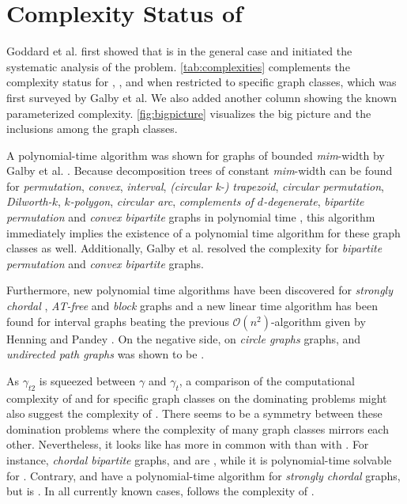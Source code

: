 \section{Complexity Status of \sdom}\label{ch:complexity-status}

Goddard et al. \cite{Goddard2014} first showed that \SDOM is \NPc in the general case and initiated the systematic analysis of the problem.  
\cref{tab:complexities} complements the complexity status for \doms, \sdoms, and \tdoms when restricted to specific graph classes, which was first surveyed by Galby et al. \cite{Galby2020}
We also added another column showing the known parameterized complexity. 
\cref{fig:bigpicture} visualizes the big picture and the inclusions among the graph classes.

A polynomial-time algorithm was shown for graphs of bounded \textit{mim}-width by Galby et al. \cite{Galby2020}.
Because decomposition trees of constant \textit{mim}-width can be found for \textit{permutation}, \textit{convex}, \textit{interval}, \textit{(circular k-)} \textit{trapezoid}, \textit{circular permutation}, \textit{Dilworth-$k$}, \textit{$k$-polygon}, \textit{circular arc}, \textit{complements of $d$-degenerate}, \textit{bipartite permutation} and \textit{convex bipartite} graphs in polynomial time \cite{Belmonte2011}, this algorithm immediately implies the existence of a polynomial time algorithm for these graph classes as well. 
Additionally, Galby et al. resolved the complexity for \textit{bipartite permutation} and \textit{convex bipartite} graphs.

Furthermore, new polynomial time algorithms have been discovered for \textit{strongly chordal} \cite{Tripathi2021}, \textit{AT-free} \cite{Kloks2021} and \textit{block} \cite{Henning2022} graphs and a new linear time algorithm has been found for interval graphs \cite{Pradhan2021} beating the previous $\mathcal{O}(n^2)$-algorithm given by Henning and Pandey \cite{Henning2019}.
On the negative side, \sdom on \textit{circle graphs} \cite{Kloks2021} graphs, and \textit{undirected path graphs} \cite{Henning2019} was shown to be \NPc.

As $\gamma_{t2}$ is squeezed between $\gamma$ and $\gamma_t$, a comparison of the computational complexity of \sdom and \tdom for specific graph classes on the dominating problems might also suggest the complexity of \sdoms.
There seems to be a symmetry between these domination problems where the complexity of many graph classes mirrors each other.
Nevertheless, it looks like \sdoms has more in common with \doms than with \tdoms.
For instance, \textit{chordal bipartite} graphs, \sdoms and \doms are \NPc, while it is polynomial-time solvable for \tdoms. 
Contrary, \sdoms and \doms have a polynomial-time algorithm for \textit{strongly chordal} graphs, but \tdoms is \NPc.
In all currently known cases, \sdom follows the complexity of \dom.

